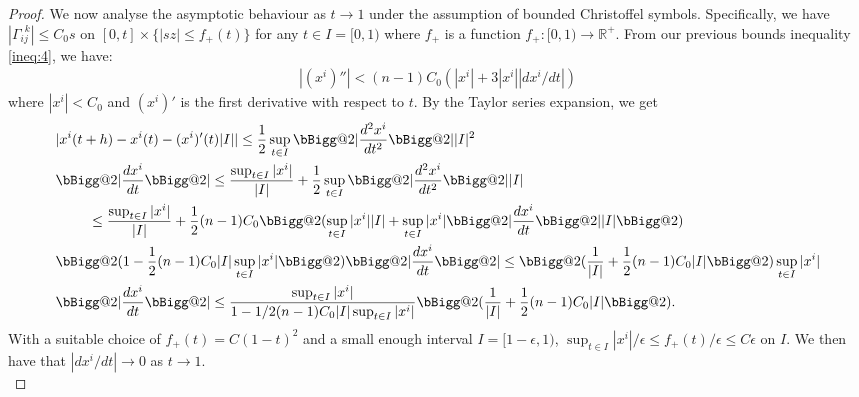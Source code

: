 \documentclass[pdflatex,sn-mathphys-num]{sn-jnl}
\makeatletter
\newcommand{\vast}{\bBigg@{2}}
\theoremstyle{definition}
\makeatother
\begin{document}
\begin{proof}
We now analyse the asymptotic behaviour as $t \rightarrow 1$ under the assumption of bounded Christoffel symbols. Specifically, we have $|\Gamma_{ij}^{~~k}| \leq C_0s$ on $[0,t] \times \{|sz| \leq f_{+}(t)\} $ for any $t \in I = [0,1)$ where $f_+$ is a function $f_+: [0,1) \rightarrow \mathbb{R}^+$. From our previous bounds inequality \ref{ineq:4}, we have:
\begin{align}
    |(x^i )''| < (n-1)C_0(|x^i| + 3|x^i||dx^i/dt|)
\end{align}
where $|x^i| < C_0$ and $(x^i)'$ is the first derivative with respect to $t$. By the Taylor series expansion, we get 
\begin{align*}
    &|x^i(t+h) - x^i(t) - (x^i)'(t)|I|| \leq \frac{1}{2}\sup_{t \in I}\vast|\frac{d^2x^i}{dt^2}\vast||I|^2\\
    &\vast|\frac{dx^i}{dt}\vast| \leq \frac{\sup_{t \in I}|x^i|}{|I|} + \frac{1}{2}\sup_{t \in I}\vast|\frac{d^2x^i}{dt^2}\vast||I|\\
    &\ \ \ \ \ \ \ \leq \frac{\sup_{t \in I}|x^i|}{|I|} + \frac{1}{2}(n-1)C_0\vast(\sup_{t \in I}|x^i||I| + \sup_{t \in I}|x^i|\vast|\frac{dx^i}{dt}\vast||I|\vast)\\
    &\vast(1 - \frac{1}{2}(n-1)C_0|I|\sup_{t \in I}|x^i|\vast)\vast|\frac{dx^i}{dt}\vast| \leq \vast(\frac{1}{|I|} + \frac{1}{2}(n-1)C_0|I|\vast)\sup_{t \in I}|x^i|\\
    &\vast|\frac{dx^i}{dt}\vast|\leq \frac{\sup_{t \in I}|x^i|}{1 - 1/2(n-1)C_0|I|\sup_{t \in I}|x^i|} \vast(\frac{1}{|I|} + \frac{1}{2}(n-1)C_0|I|\vast).
\end{align*}
With a suitable choice of $f_+(t) = C(1-t)^2$ and a small enough interval $I = [1 - \epsilon,1)$, $\sup_{t \in I}|x^i|/\epsilon \leq f_+(t)/\epsilon \leq C\epsilon$ on $I$. We then have that $|dx^i/dt| \rightarrow 0$ as $t \rightarrow 1$.\\


\end{proof}
\end{document}
